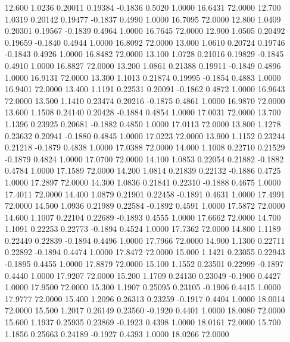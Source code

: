   12.600   1.0236   0.20011   0.19384  -0.1836   0.5020   1.0000  16.6431  72.0000
  12.700   1.0319   0.20142   0.19477  -0.1837   0.4990   1.0000  16.7095  72.0000
  12.800   1.0409   0.20301   0.19567  -0.1839   0.4964   1.0000  16.7645  72.0000
  12.900   1.0505   0.20492   0.19659  -0.1840   0.4944   1.0000  16.8092  72.0000
  13.000   1.0610   0.20724   0.19746  -0.1843   0.4926   1.0000  16.8482  72.0000
  13.100   1.0728   0.21016   0.19829  -0.1845   0.4910   1.0000  16.8827  72.0000
  13.200   1.0861   0.21388   0.19911  -0.1849   0.4896   1.0000  16.9131  72.0000
  13.300   1.1013   0.21874   0.19995  -0.1854   0.4883   1.0000  16.9401  72.0000
  13.400   1.1191   0.22531   0.20091  -0.1862   0.4872   1.0000  16.9643  72.0000
  13.500   1.1410   0.23474   0.20216  -0.1875   0.4861   1.0000  16.9870  72.0000
  13.600   1.1508   0.24140   0.20428  -0.1884   0.4854   1.0000  17.0031  72.0000
  13.700   1.1396   0.23925   0.20681  -0.1882   0.4850   1.0000  17.0113  72.0000
  13.800   1.1278   0.23632   0.20941  -0.1880   0.4845   1.0000  17.0223  72.0000
  13.900   1.1152   0.23244   0.21218  -0.1879   0.4838   1.0000  17.0388  72.0000
  14.000   1.1008   0.22710   0.21529  -0.1879   0.4824   1.0000  17.0700  72.0000
  14.100   1.0853   0.22054   0.21882  -0.1882   0.4784   1.0000  17.1589  72.0000
  14.200   1.0814   0.21839   0.22132  -0.1886   0.4725   1.0000  17.2897  72.0000
  14.300   1.0836   0.21841   0.22310  -0.1888   0.4675   1.0000  17.4011  72.0000
  14.400   1.0879   0.21901   0.22458  -0.1891   0.4631   1.0000  17.4991  72.0000
  14.500   1.0936   0.21989   0.22584  -0.1892   0.4591   1.0000  17.5872  72.0000
  14.600   1.1007   0.22104   0.22689  -0.1893   0.4555   1.0000  17.6662  72.0000
  14.700   1.1091   0.22253   0.22773  -0.1894   0.4524   1.0000  17.7362  72.0000
  14.800   1.1189   0.22449   0.22839  -0.1894   0.4496   1.0000  17.7966  72.0000
  14.900   1.1300   0.22711   0.22892  -0.1894   0.4474   1.0000  17.8472  72.0000
  15.000   1.1421   0.23055   0.22943  -0.1895   0.4455   1.0000  17.8879  72.0000
  15.100   1.1552   0.23501   0.22999  -0.1897   0.4440   1.0000  17.9207  72.0000
  15.200   1.1709   0.24130   0.23049  -0.1900   0.4427   1.0000  17.9500  72.0000
  15.300   1.1907   0.25095   0.23105  -0.1906   0.4415   1.0000  17.9777  72.0000
  15.400   1.2096   0.26313   0.23259  -0.1917   0.4404   1.0000  18.0014  72.0000
  15.500   1.2017   0.26149   0.23560  -0.1920   0.4401   1.0000  18.0080  72.0000
  15.600   1.1937   0.25935   0.23869  -0.1923   0.4398   1.0000  18.0161  72.0000
  15.700   1.1856   0.25663   0.24189  -0.1927   0.4393   1.0000  18.0266  72.0000
